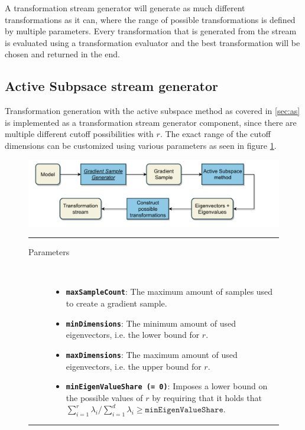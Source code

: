 \documentclass[
  a4paper,  %
  twoside,  %
  bibliography=totoc,
  headsepline,
  cleardoublepage=empty,
  parskip=half,
  draft=false
]{scrbook}
\newcommand{\delimit}{{\color{charcoal}\noindent\rule{\textwidth}{1pt}}}
\begin{document}
A transformation stream generator will generate as much different transformations as it can, where the range of possible transformations is defined by multiple parameters.
Every transformation that is generated from the stream is evaluated using a transformation evaluator and the best transformation will be chosen and returned in the end.

\newpage

\subsection{Active Subpsace stream generator}

Transformation generation with the active subspace method as covered in \cref{sec:as} is implemented as a transformation stream generator component, since there are multiple different cutoff possibilities with $r$.
The exact range of the cutoff dimensions can be customized using various parameters as seen in figure \cref{fig:astsg}.

\begin{mdframed}[style=style,frametitle={Transformation stream generator (active subspaces)}]
\begin{figure}[H]
\vspace{5px}
\includegraphics[width=\textwidth]{graphics/TransformationStreamGen_AS.pdf}

\delimit

\begin{description}
\item[Parameters] {~ \begin{itemize}[\indent{}]
\item \texttt{\textbf{maxSampleCount}}: The maximum amount of samples used to create a gradient sample.
\item \texttt{\textbf{minDimensions}}: The minimum amount of used eigenvectors, i.e. the lower bound for $r$.
\item \texttt{\textbf{maxDimensions}}: The maximum amount of used eigenvectors, i.e. the upper bound for $r$.
\item \texttt{\textbf{minEigenValueShare (= 0)}}: Imposes a lower bound on the possible values of $r$ by requiring that it holds that $\sum_{i=1}^r \lambda_i / \sum_{i=1}^d \lambda_i \geq \texttt{minEigenValueShare}$.
\end{itemize}}
\end{description}
\delimit
{}
\label{fig:astsg}
\end{figure}
\end{mdframed}
\end{document}
